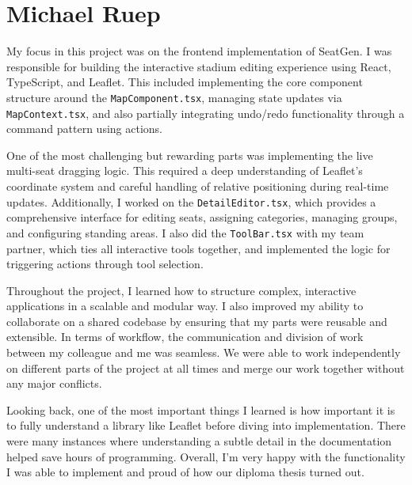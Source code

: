 \section{Michael Ruep}

My focus in this project was on the frontend implementation of SeatGen. I was responsible for building the interactive stadium editing experience using React, TypeScript, and Leaflet. This included implementing the core component structure around the \texttt{MapComponent.tsx}, managing state updates via \texttt{MapContext.tsx}, and also partially integrating undo/redo functionality through a command pattern using actions.

One of the most challenging but rewarding parts was implementing the live multi-seat dragging logic. This required a deep understanding of Leaflet’s coordinate system and careful handling of relative positioning during real-time updates. Additionally, I worked on the \texttt{DetailEditor.tsx}, which provides a comprehensive interface for editing seats, assigning categories, managing groups, and configuring standing areas. I also did the \texttt{ToolBar.tsx} with my team partner, which ties all interactive tools together, and implemented the logic for triggering actions through tool selection.

Throughout the project, I learned how to structure complex, interactive applications in a scalable and modular way. I also improved my ability to collaborate on a shared codebase by ensuring that my parts were reusable and extensible. In terms of workflow, the communication and division of work between my colleague and me was seamless. We were able to work independently on different parts of the project at all times and merge our work together without any major conflicts.

Looking back, one of the most important things I learned is how important it is to fully understand a library like Leaflet before diving into implementation. There were many instances where understanding a subtle detail in the documentation helped save hours of programming. Overall, I’m very happy with the functionality I was able to implement and proud of how our diploma thesis turned out.

